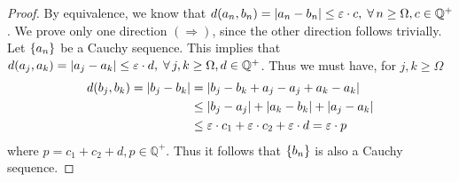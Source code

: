 {
\begin{proof}
    By equivalence, we know that $d(a_n, b_n)=\left\lvert a_n-b_n \right\rvert \leq \varepsilon \cdot c, \;\forall\, n \geq \Omega, c \in \mathbb{Q}^+$. We prove only one direction $(\Rightarrow)$, since the other direction follows trivially. 
    Let $\{a_n\}$ be a Cauchy sequence. This implies that $d(a_j, a_k)=\left\lvert a_j-a_k \right\rvert \leq \varepsilon \cdot d, \;\forall\, j,k \geq \Omega, d \in \mathbb{Q}^+$.
    Thus we must have, for $j,k \geq \Omega$
    \begin{align*}
        d(b_j, b_k) = \left\lvert b_j-b_k \right\rvert &= \left\lvert b_j-b_k +a_j-a_j +a_k-a_k \right\rvert \\
        & \leq \left\lvert b_j -a_j \right\rvert + \left\lvert a_k-b_k \right\rvert + \left\lvert a_j-a_k \right\rvert \\
        & \leq \varepsilon \cdot c_1 + \varepsilon \cdot c_2 + \varepsilon \cdot d = \varepsilon \cdot p
    \end{align*}
    where $p=c_1+c_2+d, p\in \mathbb{Q}^+$. Thus it follows that $\{b_n\}$ is also a Cauchy sequence.
\end{proof}

}
